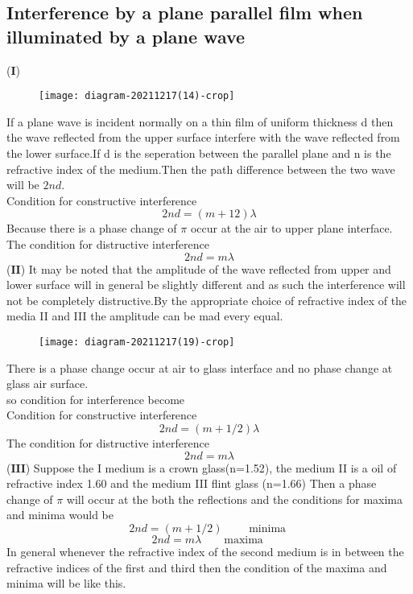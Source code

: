 \subsection{Interference by a plane parallel film when illuminated by a plane wave}

($\textbf{I}$) 
\begin{figure}[H]
	\centering
	\texttt{[image: diagram-20211217(14)-crop]}
	\caption{}
	\label{}
\end{figure}
If a plane wave is incident normally on a thin film of uniform thickness d then the wave reflected from the upper surface interfere with the wave reflected from the lower surface.If d is the seperation between the parallel plane and n is the refractive index of the medium.Then the path difference between the two wave will be $2nd$.\\
Condition for constructive interference 
$$2nd=\left( m+12\right)\lambda $$
Because there is a phase change of $\pi$ occur at the air to upper plane interface.\\
The condition for distructive interference\\
$$2nd=m\lambda$$
($\textbf{II}$) It may be noted that the amplitude of the wave reflected from upper and lower surface will in general be slightly different and as such the interference will not be completely distructive.By the appropriate choice of refractive index of the media II and III the amplitude can be mad every equal.\\
\begin{figure}[H]
	\centering
	\texttt{[image: diagram-20211217(19)-crop]}
	\caption{}
	\label{}
\end{figure}
There  is a phase change occur at air to glass interface and no  phase change at glass air surface.\\
so condition for interference become\\
Condition for constructive interference 
$$2nd=\left( m+1/2\right)\lambda $$
The condition for distructive interference\\
$$2nd=m\lambda$$
($\textbf{III}$) Suppose the I medium is a crown glass(n=1.52), the medium II is a oil of refractive index 1.60 and the medium III flint glass (n=1.66) Then a phase change of $\pi$ will occur at the both the reflections and the conditions for maxima and minima would be \\
$$2nd=\left( m+1/2\right)  \quad \quad \text{ minima } $$ 
$$2nd=m\lambda \quad \quad \text{maxima }$$
In general whenever the refractive index of the second medium is in between the refractive indices of the first and third then the condition of the maxima and minima will be like this.\\
